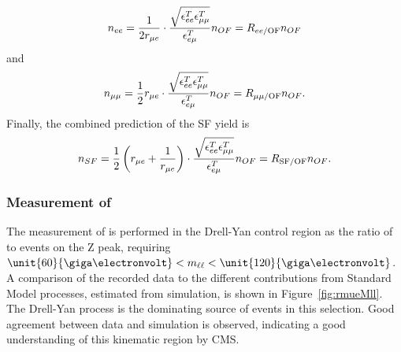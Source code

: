 \begin{equation}
n_{ee} = \frac{1}{2r_{\mu e}} \cdot \frac{\sqrt{\epsilon_{ee}^T \epsilon_{\mu\mu}^T}}{\epsilon_{e\mu}^T} n_{OF} = R_\text{$ee$/OF} n_{OF}
\label{eq:nee}
\end{equation} 
and
\begin{equation}
n_{\mu\mu} = \frac{1}{2}r_{\mu e}  \cdot \frac{\sqrt{\epsilon_{ee}^T \epsilon_{\mu\mu}^T}}{\epsilon_{e\mu}^T} n_{OF} = R_\text{$\mu\mu$/OF} n_{OF}.
\label{eq:nmm}
\end{equation} 
Finally, the combined prediction of the SF yield is
\begin{equation}
n_{SF} = \frac{1}{2}\left(r_{\mu e} + \frac{1}{r_{\mu e}}\right) \cdot \frac{\sqrt{\epsilon_{ee}^T \epsilon_{\mu\mu}^T}}{\epsilon_{e\mu}^T}  n_{OF} = R_{\text{SF/OF}} n_{OF}.
\label{eq:nsf}
\end{equation}
\subsubsection{Measurement of \rmue}
The measurement of \rmue is performed in the Drell-Yan control region as the ratio of \MM to \EE events on the Z peak, requiring $\unit{60}{\giga\electronvolt} < \mll < \unit{120}{\giga\electronvolt}$. A comparison of the recorded data to the different contributions  from Standard Model processes, estimated from simulation, is shown in Figure~\ref{fig:rmueMll}. The Drell-Yan process is the dominating source of events in this selection. Good agreement between data and simulation is observed, indicating a good understanding of this kinematic region by CMS.   

